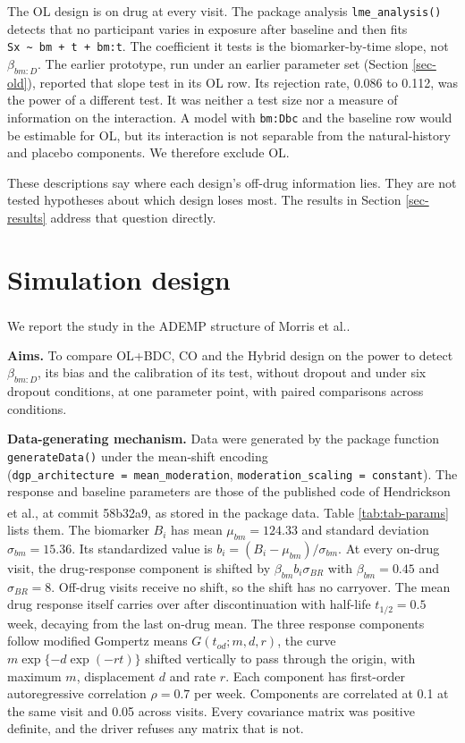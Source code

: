 \documentclass[
  11pt,
]{article}
\begin{document}
The OL design is on drug at every visit. The package analysis
\texttt{lme\_analysis()} detects that no participant varies in exposure after
baseline and then fits \texttt{Sx\ \textasciitilde{}\ bm\ +\ t\ +\ bm:t}. The coefficient it tests
is the biomarker-by-time slope, not \(\beta_{bm:D}\). The earlier
prototype, run under an earlier parameter set
(Section \ref{sec-old}), reported that slope test in its OL row. Its
rejection rate,
0.086 to
0.112, was the power of a different
test. It was neither a test size nor a measure of information on the
interaction. A model with \texttt{bm:Dbc} and the baseline row would be
estimable for OL, but its interaction is not separable from the
natural-history and placebo components. We therefore exclude OL.

These descriptions say where each design's off-drug information lies.
They are not tested hypotheses about which design loses most. The
results in Section \ref{sec-results} address that question directly.

\section{Simulation design}\label{sec-sim}

We report the study in the ADEMP structure of Morris et al.\textsuperscript{}.

\textbf{Aims.} To compare OL+BDC, CO and the Hybrid design on the power to
detect \(\beta_{bm:D}\), its bias and the calibration of its test,
without dropout and under six dropout conditions, at one parameter
point, with paired comparisons across conditions.

\textbf{Data-generating mechanism.} Data were generated by the package
function \texttt{generateData()} under the mean-shift encoding
(\texttt{dgp\_architecture\ =\ \textquotesingle{}mean\_moderation\textquotesingle{}},
\texttt{moderation\_scaling\ =\ \textquotesingle{}constant\textquotesingle{}}). The response and baseline
parameters are those of the published code of Hendrickson et al.\textsuperscript{}, at commit 58b32a9, as stored in the package
data. Table
\ref{tab:tab-params} lists them. The biomarker \(B_i\) has mean
\(\mu_{bm} = 124.33\) and standard deviation
\(\sigma_{bm} = 15.36\). Its standardized value
is \(b_i = (B_i - \mu_{bm})/\sigma_{bm}\). At every on-drug visit, the
drug-response component is shifted by \(\beta_{bm} b_i \sigma_{BR}\)
with \(\beta_{bm} = 0.45\) and
\(\sigma_{BR} = 8\). Off-drug visits receive no shift,
so the shift has no carryover. The mean drug response itself carries
over after discontinuation with half-life
\(t_{1/2} = 0.5\) week, decaying from the last on-drug mean.
The three response components follow modified Gompertz means
\(G(t_{od}; m, d, r)\), the curve \(m \exp\{-d \exp(-r t)\}\) shifted
vertically to pass through the origin, with maximum \(m\), displacement
\(d\) and rate \(r\). Each component has first-order
autoregressive correlation \(\rho = 0.7\) per week. Components are
correlated at 0.1 at the same visit and 0.05 across visits. Every
covariance matrix was positive definite, and the driver refuses any
matrix that is not.
\end{document}

